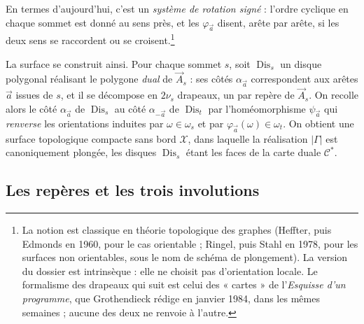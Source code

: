 \documentclass[11pt,a4paper]{article}
\begin{document}
En termes d'aujourd'hui, c'est un \emph{système de rotation signé} : l'ordre
cyclique en chaque sommet est donné au sens près, et les $\varphi_{\vec{a}}$
disent, arête par arête, si les deux sens se raccordent ou se
croisent.\footnote{La notion est classique en théorie topologique des graphes
(Heffter, puis Edmonds en 1960, pour le cas orientable ; Ringel, puis Stahl en
1978, pour les surfaces non orientables, sous le nom de schéma de plongement).
La version du dossier est intrinsèque : elle ne choisit pas d'orientation
locale. Le formalisme des drapeaux qui suit est celui des « cartes » de
l'\emph{Esquisse d'un programme}, que Grothendieck rédige en janvier 1984, dans
les mêmes semaines ; aucune des deux ne renvoie à l'autre.}

La surface se construit ainsi. Pour chaque sommet $s$, soit
$\operatorname{Dis}_s$ un disque polygonal réalisant le polygone \emph{dual} de
$\vec{A}_s$ : ses côtés $\alpha_{\vec{a}}$ correspondent aux arêtes $\vec{a}$
issues de $s$, et il se décompose en $2\nu_s$ drapeaux, un par repère de
$\vec{A}_s$. On recolle alors le côté $\alpha_{\vec{a}}$ de
$\operatorname{Dis}_s$ au côté $\alpha_{-\vec{a}}$ de $\operatorname{Dis}_t$ par
l'homéomorphisme $\psi_{\vec{a}}$ qui \emph{renverse} les orientations induites
par $\omega \in \omega_s$ et par $\varphi_{\vec{a}}(\omega) \in \omega_t$. On
obtient une surface topologique compacte sans bord $\mathcal{X}$, dans laquelle
la réalisation $|\Gamma|$ est canoniquement plongée, les disques
$\operatorname{Dis}_s$ étant les faces de la carte duale $\mathcal{C}^{*}$.

\subsection*{Les repères et les trois involutions}
\end{document}
